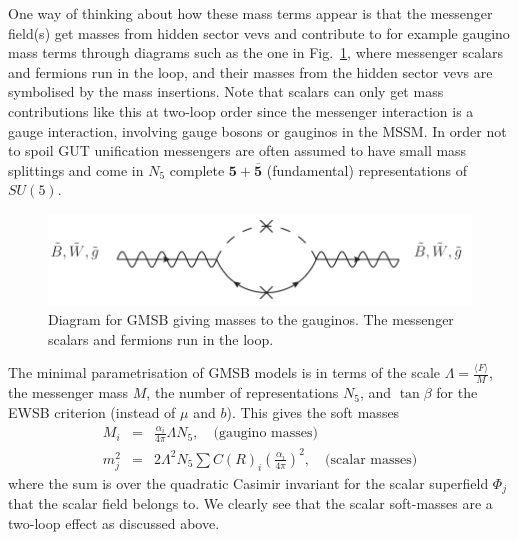 \documentclass[notes.tex]{subfiles}
\begin{document}
One way of thinking about how these mass terms appear is that the messenger field(s) get masses from hidden sector vevs and contribute to for example gaugino mass terms through diagrams such as the one in Fig.~\ref{fig:GMSB}, where messenger scalars and fermions run in the loop, and their masses from the hidden sector vevs are symbolised by the mass insertions. Note that scalars can only get mass contributions like this at two-loop order since the messenger interaction is a gauge interaction, involving gauge bosons or gauginos in the MSSM. In order not to spoil GUT unification messengers are often assumed to have small mass splittings and come in $N_5$ complete $\mathbf{5} + \overline{\mathbf{5}}$ (fundamental) representations of $SU(5)$.

\begin{figure}[h!]
\begin{center}
\includegraphics[scale=0.8]{figures/GMSB} 
\caption{Diagram for GMSB giving masses to the gauginos. The messenger scalars and fermions run in the loop.}
\label{fig:GMSB}
\end{center}
\end{figure}

The minimal parametrisation of GMSB models is in terms of the scale $\Lambda = \frac{\langle F\rangle}{M}$, the messenger mass $M$, the number of representations $N_5$, and $\tan\beta$ for the EWSB criterion (instead of $\mu$ and $b$). This gives the soft masses
\begin{eqnarray}
M_i &=& \frac{\alpha_i}{4\pi}\Lambda N_5,\quad\text{(gaugino masses)}\label{eq:GMSBgauginomass}\\
m_j^2 &=& 2\Lambda^2 N_5 \sum C(R)_i\left(\frac{\alpha_i}{4\pi}\right)^2,\quad\text{(scalar masses)}
\end{eqnarray}
where the sum is over the quadratic Casimir invariant for the scalar superfield $\Phi_j$ that the scalar field belongs to. We clearly see that the scalar soft-masses are a two-loop effect as discussed above. 
\end{document}
